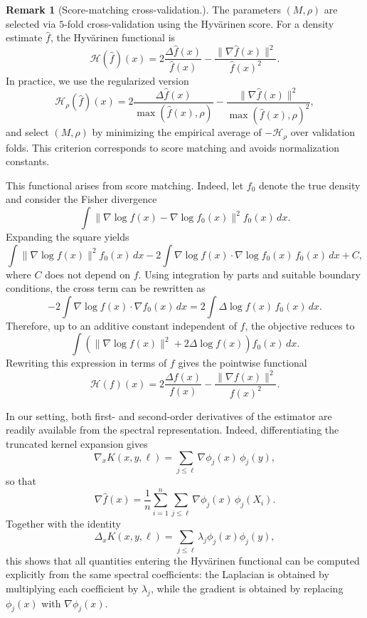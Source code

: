 \documentclass[preprint]{imsart}
\theoremstyle{plain}
\theoremstyle{definition}
\newtheorem{remark}[theorem]{Remark}
\begin{document}
\iffalse

\begin{remark}[Score-matching cross-validation.]\label{rem:cv}
    The parameters $(M,\rho)$ are selected via $5$-fold cross-validation using the Hyvärinen score. For a density estimate $\hat f$, the Hyvärinen functional is
    $$
    \mathcal{H}(\hat f)(x)
    = 2 \frac{\Delta \hat f(x)}{\hat f(x)} - \frac{\|\nabla \hat f(x)\|^2}{\hat f(x)^2}.
    $$
    In practice, we use the regularized version
    $$
    \mathcal{H}_{\rho}(\hat f)(x)
    = 2 \frac{\Delta \hat f(x)}{\max(\hat f(x),\rho)}
    - \frac{\|\nabla \hat f(x)\|^2}{\max(\hat f(x),\rho)^2},
    $$
    and select $(M,\rho)$ by minimizing the empirical average of $-\mathcal{H}_\rho$ over validation folds. This criterion corresponds to score matching and avoids normalization constants.
    
    This functional arises from score matching. Indeed, let $f_0$ denote the true density and consider the Fisher divergence
    $$
    \int \|\nabla \log f(x) - \nabla \log f_0(x)\|^2 f_0(x)\,dx.
    $$
    Expanding the square yields
    $$
    \int \|\nabla \log f(x)\|^2 f_0(x)\,dx
    - 2 \int \nabla \log f(x)\cdot \nabla \log f_0(x)\, f_0(x)\,dx + C,
    $$
    where $C$ does not depend on $f$. Using integration by parts and suitable boundary conditions, the cross term can be rewritten as
    $$
    -2 \int \nabla \log f(x)\cdot \nabla f_0(x)\,dx
    = 2 \int \Delta \log f(x)\, f_0(x)\,dx.
    $$
    Therefore, up to an additive constant independent of $f$, the objective reduces to
    $$
    \int \left( \|\nabla \log f(x)\|^2 + 2 \Delta \log f(x) \right) f_0(x)\,dx.
    $$
    Rewriting this expression in terms of $f$ gives the pointwise functional
    $$
    \mathcal{H}(f)(x)
    = 2 \frac{\Delta f(x)}{f(x)} - \frac{\|\nabla f(x)\|^2}{f(x)^2}.
    $$
    
    In our setting, both first- and second-order derivatives of the estimator are readily available from the spectral representation. Indeed, differentiating the truncated kernel expansion gives
    $$
    \nabla_x K(x,y,\ell)
    =
    \sum_{j\le \ell} \nabla \phi_j(x)\,\phi_j(y),
    $$
    so that
    $$
    \nabla \hat f(x)
    =
    \frac{1}{n}
    \sum_{i=1}^n
    \sum_{j\le \ell}
    \nabla \phi_j(x)\,\phi_j(X_i).
    $$
    Together with the identity
    $$
    \Delta_x K(x,y,\ell)
    =
    \sum_{j\le \ell} \lambda_j \phi_j(x)\phi_j(y),
    $$
    this shows that all quantities entering the Hyvärinen functional can be computed explicitly from the same spectral coefficients: the Laplacian is obtained by multiplying each coefficient by $\lambda_j$, while the gradient is obtained by replacing $\phi_j(x)$ with $\nabla \phi_j(x)$.
    \end{remark}
\end{document}
